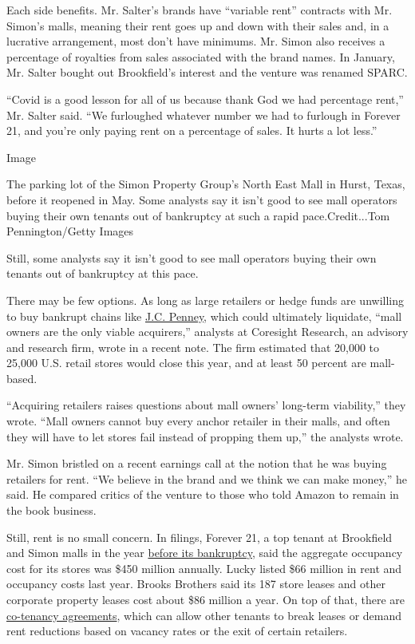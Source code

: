 Each side benefits. Mr. Salter's brands have ``variable rent'' contracts
with Mr. Simon's malls, meaning their rent goes up and down with their
sales and, in a lucrative arrangement, most don't have minimums. Mr.
Simon also receives a percentage of royalties from sales associated with
the brand names. In January, Mr. Salter bought out Brookfield's interest
and the venture was renamed SPARC.

``Covid is a good lesson for all of us because thank God we had
percentage rent,'' Mr. Salter said. ``We furloughed whatever number we
had to furlough in Forever 21, and you're only paying rent on a
percentage of sales. It hurts a lot less.''

Image

The parking lot of the Simon Property Group's North East Mall in Hurst,
Texas, before it reopened in May. Some analysts say it isn't good to see
mall operators buying their own tenants out of bankruptcy at such a
rapid pace.Credit...Tom Pennington/Getty Images

Still, some analysts say it isn't good to see mall operators buying
their own tenants out of bankruptcy at this pace.

There may be few options. As long as large retailers or hedge funds are
unwilling to buy bankrupt chains like
\href{https://www.nytimes3xbfgragh.onion/live/2020/09/01/business/stock-market-today-coronavirus/jc-penney-has-10-days-to-avoid-liquidation}{J.C.
Penney}, which could ultimately liquidate, ``mall owners are the only
viable acquirers,'' analysts at Coresight Research, an advisory and
research firm, wrote in a recent note. The firm estimated that 20,000 to
25,000 U.S. retail stores would close this year, and at least 50 percent
are mall-based.

``Acquiring retailers raises questions about mall owners' long-term
viability,'' they wrote. ``Mall owners cannot buy every anchor retailer
in their malls, and often they will have to let stores fail instead of
propping them up,'' the analysts wrote.

Mr. Simon bristled on a recent earnings call at the notion that he was
buying retailers for rent. ``We believe in the brand and we think we can
make money,'' he said. He compared critics of the venture to those who
told Amazon to remain in the book business.

Still, rent is no small concern. In filings, Forever 21, a top tenant at
Brookfield and Simon malls in the year
\href{https://www.nytimes3xbfgragh.onion/2019/10/23/business/forever-21-bankruptcy-chang-family.html}{before
its bankruptcy}, said the aggregate occupancy cost for its stores was
\$450 million annually. Lucky listed \$66 million in rent and occupancy
costs last year. Brooks Brothers said its 187 store leases and other
corporate property leases cost about \$86 million a year. On top of
that, there are
\href{https://www.nytimes3xbfgragh.onion/2020/07/05/business/coronavirus-malls-department-stores-bankruptcy.html}{co-tenancy
agreements}, which can allow other tenants to break leases or demand
rent reductions based on vacancy rates or the exit of certain retailers.

